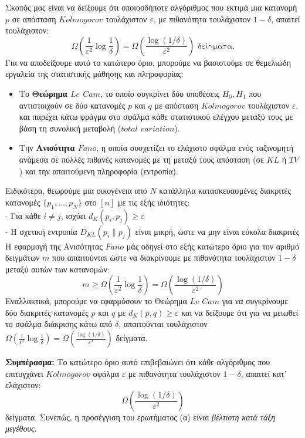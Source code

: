 \documentclass[12pt]{article}
\begin{document}
Σκοπός μας είναι να δείξουμε ότι οποιοσδήποτε αλγόριθμος που εκτιμά μια κατανομή $p$ σε απόσταση $Kolmogorov$ τουλάχιστον $\varepsilon$, με πιθανότητα τουλάχιστον $1 - \delta$, απαιτεί τουλάχιστον:
\[
\Omega\left( \frac{1}{\varepsilon^2} \log \frac{1}{\delta} \right) = \Omega\left( \frac{\log(1/\delta)}{\varepsilon^2} \right) \text{ δείγματα.}
\]
Για να αποδείξουμε αυτό το κατώτερο όριο, μπορούμε να βασιστούμε σε θεμελιώδη εργαλεία της στατιστικής μάθησης και πληροφορίας:
\begin{itemize}
    \item Το \textbf{Θεώρημα $Le$ $Cam$}, το οποίο συγκρίνει δύο υποθέσεις $H_0, H_1$ που αντιστοιχούν σε δύο κατανομές $p$ και $q$ με απόσταση $Kolmogorov$ τουλάχιστον $\varepsilon$, και παρέχει κάτω φράγμα στο σφάλμα κάθε στατιστικού ελέγχου μεταξύ τους με βάση τη συνολική μεταβολή ($total$ $variation$).
    \item Την \textbf{Ανισότητα $Fano$}, η οποία συσχετίζει το ελάχιστο σφάλμα ενός ταξινομητή ανάμεσα σε πολλές πιθανές κατανομές με τη μεταξύ τους απόσταση (σε $KL$ ή $TV$) και την απαιτούμενη πληροφορία (εντροπία).
\end{itemize}
Ειδικότερα, θεωρούμε μια οικογένεια από $N$ κατάλληλα κατασκευασμένες διακριτές κατανομές $\{p_1, \dots, p_N\}$ στο $[n]$ με τις εξής ιδιότητες:\\
- Για κάθε $i \neq j$, ισχύει $d_K(p_i, p_j) \geq \varepsilon$ \\
- Η σχετική εντροπία $D_{KL}(p_i \| p_j)$ είναι μικρή, ώστε να μην είναι εύκολα διακριτές\\
Η εφαρμογή της Ανισότητας $Fano$ μάς οδηγεί στο εξής κατώτερο όριο για τον αριθμό δειγμάτων $m$ που απαιτούνται ώστε να διακρίνουμε με πιθανότητα τουλάχιστον $1 - \delta$ μεταξύ αυτών των κατανομών:
\[
m \geq \Omega\left( \frac{1}{\varepsilon^2} \log \frac{1}{\delta} \right) = \Omega\left( \frac{\log(1/\delta)}{\varepsilon^2} \right)
\]
Εναλλακτικά, μπορούμε να εφαρμόσουν το Θεώρημα $Le$ $Cam$ για να συγκρίνουμε δύο διακριτές κατανομές $p$ και $q$ με $d_K(p, q) \geq \varepsilon$ και να δείξουμε ότι για να μειωθεί το σφάλμα διάκρισης κάτω από $\delta$, απαιτούνται τουλάχιστον $\Omega\left( \frac{1}{\varepsilon^2} \log \frac{1}{\delta} \right) = \Omega\left( \frac{\log(1/\delta)}{\varepsilon^2} \right)$ δείγματα.

\vspace{0.5em}
\noindent
\textbf{Συμπέρασμα:} Το κατώτερο όριο αυτό επιβεβαιώνει ότι κάθε αλγόριθμος που επιτυγχάνει $Kolmogorov$ σφάλμα $\varepsilon$ με πιθανότητα τουλάχιστον $1 - \delta$, απαιτεί κατ’ ελάχιστον:
\[
\Omega\left( \frac{\log(1/\delta)}{\varepsilon^2} \right)
\]
δείγματα. Συνεπώς, η προσέγγιση του ερωτήματος (α) είναι \textit{βέλτιστη κατά τάξη μεγέθους}.
\end{document}
